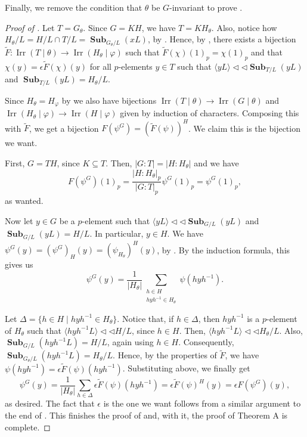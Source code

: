 \documentclass[12pt]{amsart}
\DeclareMathOperator{\Sub}{\mathbf{Sub}}
\DeclareMathOperator{\Irr}{Irr}
\theoremstyle{remark}
\theoremstyle{definition}
\theoremstyle{plain}
\theoremstyle{definition}
\numberwithin{equation}{section}
\begin{document}
Finally, we remove the condition that $\theta$ be $G$-invariant to prove . 

\begin{proof}[Proof of ]
	Let $T = G_\theta$. Since $G = KH$, we have $T = KH_\theta$. Also, notice how $H_\theta/L = H/L \cap T/L = \Sub_{G_\theta/L}(xL)$, by . Hence, by , there exists a bijection $\tilde{F}: \Irr(T\mid \theta) \to \Irr(H_\theta \mid \varphi)$ such that $\tilde{F}(\chi)(1)_p = \chi(1)_p$ and that $\chi(y) = \epsilon \tilde{F}(\chi)(y)$ for all $p$-elements $y \in T$ such that $\langle yL \rangle {\triangleleft}{\triangleleft} \Sub_{T/L}(yL)$ and $\Sub_{T/L}(yL) = H_\theta/L$. 
	
	Since $H_\theta = H_\varphi$ by  we also have bijections $\Irr(T \mid \theta) \to \Irr(G \mid \theta)$ and $\Irr(H_\theta \mid \varphi) \to \Irr(H \mid \varphi)$ given by induction of characters. Composing this with $\tilde{F}$, we get a bijection $F(\psi^G) = (\tilde{F}(\psi))^H$. We claim this is the bijection we want. 
	
	First, $G = TH$, since $K \subseteq T$. Then, $|G:T| = |H:H_\theta|$ and we have
	\begin{equation*}
		F(\psi^G)(1)_p = \frac{|H:H_\theta|_p}{|G:T|_p}\psi^G(1)_p = \psi^G(1)_p,
	\end{equation*}
	as wanted. 
	
	Now let $y \in G$ be a $p$-element such that $\langle yL \rangle {\triangleleft}{\triangleleft} \Sub_{G/L}(yL)$ and $\Sub_{G/L}(yL) = H/L$. In particular, $y \in H$. We have $\psi^G(y) = (\psi^G)_H(y) = (\psi_{H_\theta})^H(y)$, by \cite[Problem 5.2]{CTFG}. By the induction formula, this gives us
	\begin{equation*}
		\psi^G(y) = \frac{1}{|H_\theta|} \sum_{\substack{h \in H \\ hyh^{-1} \in H_\theta}} \psi(hyh^{-1}).
	\end{equation*}
	
	Let $\Delta = \{h \in H \mid hyh^{-1} \in H_\theta\}$. Notice that, if $h \in \Delta$, then $hyh^{-1}$ is a $p$-element of $H_\theta$ such that $\langle hyh^{-1}L \rangle {\triangleleft}{\triangleleft} H/L$, since $h \in H$. Then, $\langle hyh^{-1}L \rangle {\triangleleft}{\triangleleft} H_{\theta}/L$. Also, $\Sub_{G/L}(hyh^{-1}L) = H/L$, again using $h \in H$. Consequently, $\Sub_{G_\theta/L}(hyh^{-1}L) = H_\theta/L$. Hence, by the properties of $\tilde{F}$, we have $\psi(hyh^{-1}) = \epsilon\tilde{F}(\psi)(hyh^{-1})$. Substituting above, we finally get
	\begin{equation*}
		\psi^G(y) = \frac{1}{|H_\theta|}\sum_{h \in \Delta} \epsilon\tilde{F}(\psi)(hyh^{-1}) = \epsilon \tilde{F}(\psi)^H(y) = \epsilon F(\psi^G)(y),
	\end{equation*}
	as desired. The fact that $\epsilon$ is the one we want follows from a similar argument to the end of . This finishes the proof of  and, with it, the proof of Theorem A is complete.
\end{proof}
\end{document}
